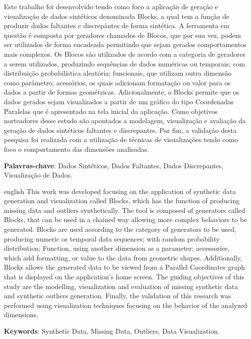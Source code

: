 \documentclass[
	12pt,				%
	openright,			%
	oneside,			%
	a4paper,			%
	english,			%
	brazil				%
	]{abntex2}
\begin{document}
\setlength{\absparsep}{18pt} %
\begin{resumo}

	Este trabalho foi desenvolvido tendo como foco a aplicação de geração e visualização de dados sintéticos denominada Blocks,
	 a qual tem a função de produzir dados faltantes e discrepântes de forma sintética.
	A ferramenta em questão é composta por geradores chamados de Blocos, que por sua vez, podem ser utilizados de forma encadeada permitindo que sejam gerados comportamentos mais complexos.
	Os Blocos são utilizados de acordo com a categoria de geradores a serem utilizados, produzindo 
	 sequências de dados numéricas ou temporais; 
	 com distribuição probabilística aleatória;
	 funcionais, que utilizam outra dimensão como parâmetro;
	 acessórios, os quais adicionam formatação ou valor para os dados a partir de formas geométricas.
	Adicionalmente, o Blocks permite que os dados gerados sejam visualizados a partir de um gráfico do tipo Coordenadas Paralelas que é apresentado na tela inicial da aplicação.
	Como objetivos norteadores desse estudo são apontados a modelagem, visualização e avaliação da geração de dados sintéticos faltantes e discrepantes.
	Por fim, a validação desta pesquisa foi realizada com a utilização de técnicas de visualizações tendo como foco o comportamento das dimensões analisadas.

 \textbf{Palavras-chave}: Dados Sintéticos, Dados Faltantes, Dados Discrepantes, Visualização de Dados.
\end{resumo}

\begin{resumo}[Abstract]
 \begin{otherlanguage*}{english}
	This work was developed focusing on the application of synthetic data generation and visualization called Blocks,
	which has the function of producing missing data and outliers synthetically.
	The tool is composed of generators called Blocks, that can be used in a chained way allowing more complex behaviors to be generated.
	Blocks are used according to the category of generators to be used, producing
	numeric or temporal data sequences;
	with random probability distribution;
	Function, using another dimension as a parameter;
	accessories, which add formatting, or value to the data from geometric shapes.
	Additionally, Blocks allows the generated data to be viewed from a Parallel Coordinates graph that is displayed on the application's home screen.
	The guiding objectives of this study are the modelling, visualization and evaluation of missing synthetic data and synthetic outliers generation.
	Finally, the validation of this research was performed using visualization techniques focusing on the behavior of the analyzed dimensions.

   \vspace{\onelineskip}
 
   \noindent 
   \textbf{Keywords}: Synthetic Data, Missing Data, Outliers, Data Visualization.
 \end{otherlanguage*}
\end{resumo}
\end{document}
